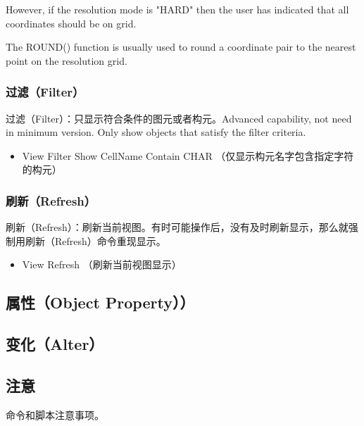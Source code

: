 However, if the resolution mode is "HARD" then the user has indicated that all
coordinates should be on grid.

The ROUND() function is usually used to round a coordinate pair to the nearest
point on the resolution grid. 

\subsubsection{过滤（Filter）} \label{SectCmdViewFltr}
过滤（Filter）：只显示符合条件的图元或者构元。Advanced capability, not need in minimum version. Only show objects that satisfy the filter criteria. 
\begin{itemize}
	\item View Filter Show CellName Contain CHAR （仅显示构元名字包含指定字符的构元）
\end{itemize}

\subsubsection{刷新（Refresh）} \label{SectCmdViewRefresh}
刷新（Refresh）：刷新当前视图。有时可能操作后，没有及时刷新显示，那么就强制用刷新（Refresh）命令重现显示。 
\begin{itemize}
	\item View Refresh （刷新当前视图显示）
\end{itemize}

\subsection{属性（Object Property））} \label{SectCmdProperty}

\subsection{变化（Alter）} \label{SectCmdCell}

\subsection{注意} \label{SectCmdNote} 
命令和脚本注意事项。

